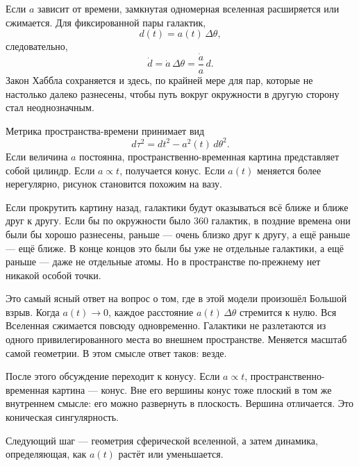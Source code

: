 Если \(a\) зависит от времени, замкнутая одномерная вселенная расширяется или сжимается. Для фиксированной пары галактик,
\begin{equation}
d(t)=a(t)\,\Delta\theta,
\end{equation}
следовательно,
\begin{equation}
\dot d=\dot a\,\Delta\theta
      =\frac{\dot a}{a}\,d.
\end{equation}
Закон Хаббла сохраняется и здесь, по крайней мере для пар, которые не настолько далеко разнесены, чтобы путь вокруг окружности в другую сторону стал неоднозначным.

Метрика пространства-времени принимает вид
\begin{equation}
d\tau^2=dt^2-a^2(t)\,d\theta^2.
\end{equation}
Если величина \(a\) постоянна, пространственно-временная картина представляет собой цилиндр. Если \(a\propto t\), получается конус. Если \(a(t)\) меняется более нерегулярно, рисунок становится похожим на вазу.

Если прокрутить картину назад, галактики будут оказываться всё ближе и ближе друг к другу. Если бы по окружности было \(360\) галактик, в поздние времена они были бы хорошо разнесены, раньше — очень близко друг к другу, а ещё раньше — ещё ближе. В конце концов это были бы уже не отдельные галактики, а ещё раньше — даже не отдельные атомы. Но в пространстве по-прежнему нет никакой особой точки.

Это самый ясный ответ на вопрос о том, где в этой модели произошёл Большой взрыв. Когда \(a(t)\to 0\), каждое расстояние \(a(t)\,\Delta\theta\) стремится к нулю. Вся Вселенная сжимается повсюду одновременно. Галактики не разлетаются из одного привилегированного места во внешнем пространстве. Меняется масштаб самой геометрии. В этом смысле ответ таков: везде.

\begin{classroomqa}
\end{classroomqa}

После этого обсуждение переходит к конусу. Если \(a\propto t\), пространственно-временная картина — конус. Вне его вершины конус тоже плоский в том же внутреннем смысле: его можно развернуть в плоскость. Вершина отличается. Это коническая сингулярность.

Следующий шаг — геометрия сферической вселенной, а затем динамика, определяющая, как \(a(t)\) растёт или уменьшается.
